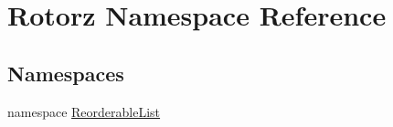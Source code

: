 \hypertarget{namespace_rotorz}{}\section{Rotorz Namespace Reference}
\label{namespace_rotorz}
\subsection*{Namespaces}
\begin{DoxyCompactItemize}
\item 
namespace \hyperlink{namespace_rotorz_1_1_reorderable_list}{Reorderable\+List}
\end{DoxyCompactItemize}
